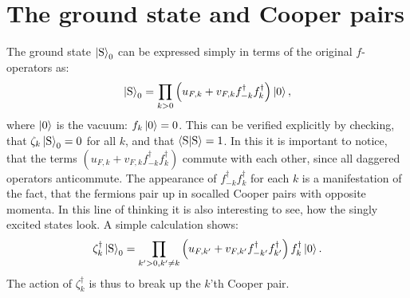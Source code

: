 \section{The ground state and Cooper pairs}
The ground state $\ket{\text{S}}_0$ can be expressed simply in terms of the original $f$-operators as:
\begin{equation}
\ket{\text{S}}_0 = \prod_{k > 0} \left(u_{F,k} + v_{F,k}f^\dagger_{-k}f^\dagger_k\right)\ket{0},
\end{equation} 
where $\ket{0}$ is the vacuum: $f_k\ket{0} = 0$. This can be verified explicitly by checking, that $\zeta_k\ket{\text{S}}_0 = 0$ for all $k$, and that 
$\braket{\text{S}|\text{S}} = 1$. In this it is important to notice, that the terms $(u_{F,k} + v_{F,k}f^\dagger_{-k}f^\dagger_k)$ commute with each other, since all daggered operators anticommute. The appearance of $f^\dagger_{-k}f^\dagger_k$ for each $k$ is a manifestation of the fact, that the fermions pair up in socalled Cooper pairs with opposite momenta. In this line of thinking it is also interesting to see, how the singly excited states look. A simple calculation shows:
\begin{equation}
\zeta^\dagger_k\ket{\text{S}}_0 = \prod_{k' > 0, k' \neq k }\left(u_{F,k'} + v_{F,k'}f^\dagger_{-k'}f^\dagger_{k'}\right)f^\dagger_k\ket{0}.
\end{equation}
The action of $\zeta^\dagger_k$ is thus to break up the $k$'th Cooper pair. 

